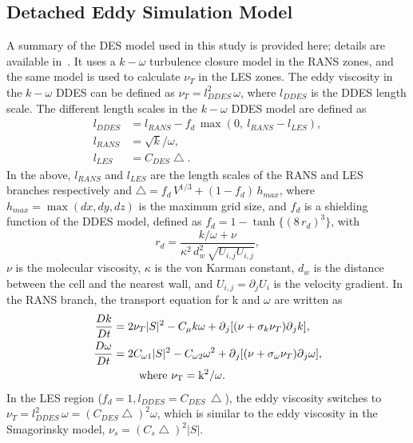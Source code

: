 \subsection{Detached Eddy Simulation Model}
\label{sec:DDES}
%
A summary of the DES model used in this study is provided here; details are
available in~\cite{yin2015dynamic}. It uses a $k-\omega$ turbulence closure
model in the RANS zones, and the same model is used to calculate $\nu_T$ in the
LES zones. The eddy viscosity in the $k-\omega$ DDES can be defined as
$\nu_T=l_{DDES}^2\, \omega$, where $l_{DDES}$ is the DDES length scale. The
different length scales in the $k-\omega$ DDES model are defined as
%
\begin{align}  
  l_{DDES} &=l_{RANS}-f_d\, \max( 0,~l_{RANS}-l_{LES}), \nonumber \\
  l_{RANS} &=\sqrt{k}/\omega, \\
  l_{LES} &=C_{DES}\bigtriangleup. \nonumber
  \label{eq:ddes_lscale}
\end{align}
%
In the above, $l_{RANS}$ and $l_{LES}$ are the length scales of the RANS and LES
branches respectively and $\bigtriangleup = f_d \,V^{1/3}+(1-f_d ) \,h_{max}$,
where $h_{max} = \max(dx,dy,dz)$ is the maximum grid size, and $f_d$ is a
shielding function of the DDES model, defined as $f_d = 1 -
\tanh\{(8\,r_d)^3\}$, with
\[
  r_d=\frac{k/\omega+\nu}{\kappa^2 \, d_w^2 \, \sqrt{U_{i,j} U_{i,j} }},
\]
$\nu$ is the molecular viscosity, $\kappa$ is the von Karman constant, $d_w$ is
the distance between the cell and the nearest wall, and $U_{i,j}=\partial_j
U_i$ is the velocity gradient.  In the RANS branch, the transport equation for
k and $\omega$ are written as
%
\begin{align}  
  \frac{Dk}{Dt} & = 2\nu_T |S|^2-C_\mu k\omega+\partial{_j [(\nu+\sigma_k \nu_T ) \partial{_j k}]}, \nonumber \\
  \frac{D\omega}{Dt} & = 2C_{\omega1} |S|^2-C_{\omega2} \omega^2 
                    +\partial{_j [(\nu+\sigma_\omega \nu_T )\partial{_j \omega}]},\\
    &~~~~~~~\rm{where}~\nu_T=k^2/\omega. \nonumber
    \label{eq:transportEqs}
\end{align}  
%
In the LES region ($f_d=1,l_{DDES}=C_{DES} \, \bigtriangleup$), the eddy
viscosity switches to
$\nu_T=l_{DDES}^2\,\omega=(C_{DES}\bigtriangleup)^2\omega$, which is similar to
the eddy viscosity in the Smagorinsky model, $\nu_s=(C_s \bigtriangleup)^2
|S|$.

